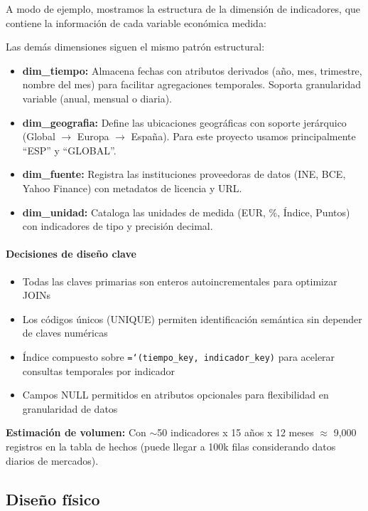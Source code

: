 \documentclass{article}
\let\oldtexttt\texttt  %
\renewcommand{\texttt}[1]{{\footnotesize\oldtexttt{\hyphenchar\font=`\-#1}}}  %
\begin{document}
A modo de ejemplo, mostramos la estructura de la dimensi\'on de indicadores, que contiene la informaci\'on de cada variable econ\'omica medida:



Las dem\'as dimensiones siguen el mismo patr\'on estructural:
\begin{itemize}
    \item \textbf{dim\_tiempo:} Almacena fechas con atributos derivados (a\~no, mes, trimestre, nombre del mes) para facilitar agregaciones temporales. Soporta granularidad variable (anual, mensual o diaria).
    \item \textbf{dim\_geografia:} Define las ubicaciones geogr\'aficas con soporte jer\'arquico (Global $\rightarrow$ Europa $\rightarrow$ Espa\~na). Para este proyecto usamos principalmente ``ESP'' y ``GLOBAL''.
    \item \textbf{dim\_fuente:} Registra las instituciones proveedoras de datos (INE, BCE, Yahoo Finance) con metadatos de licencia y URL.
    \item \textbf{dim\_unidad:} Cataloga las unidades de medida (EUR, \%, \'Indice, Puntos) con indicadores de tipo y precisi\'on decimal.
\end{itemize}

\paragraph{Decisiones de dise\~no clave}
\begin{itemize}
    \item Todas las claves primarias son enteros autoincrementales para optimizar JOINs
    \item Los c\'odigos \'unicos (UNIQUE) permiten identificaci\'on sem\'antica sin depender de claves num\'ericas
    \item \'Indice compuesto sobre \texttt{(tiempo\_key, indicador\_key)} para acelerar consultas temporales por indicador
    \item Campos NULL permitidos en atributos opcionales para flexibilidad en granularidad de datos
\end{itemize}

\textbf{Estimaci\'on de volumen:} Con $\sim$50 indicadores x 15 a\~nos x 12 meses $\approx$ 9,000 registros en la tabla de hechos (puede llegar a 100k filas considerando datos diarios de mercados).

\subsection{Dise\~no f\'isico}
\end{document}
